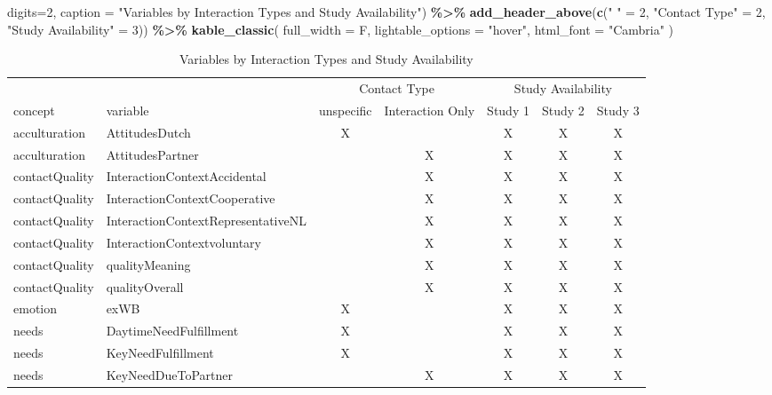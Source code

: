 \documentclass[
]{article}
\newenvironment{Shaded}{\begin{snugshade}}{\end{snugshade}}
\newcommand{\AttributeTok}[1]{\textcolor[rgb]{0.13,0.29,0.53}{#1}}
\newcommand{\DecValTok}[1]{\textcolor[rgb]{0.00,0.00,0.81}{#1}}
\newcommand{\FunctionTok}[1]{\textcolor[rgb]{0.13,0.29,0.53}{\textbf{#1}}}
\newcommand{\NormalTok}[1]{#1}
\newcommand{\OtherTok}[1]{\textcolor[rgb]{0.56,0.35,0.01}{#1}}
\newcommand{\SpecialCharTok}[1]{\textcolor[rgb]{0.81,0.36,0.00}{\textbf{#1}}}
\newcommand{\StringTok}[1]{\textcolor[rgb]{0.31,0.60,0.02}{#1}}
\begin{document}
\begin{Shaded}
\begin{Highlighting}[]
      \AttributeTok{digits=}\DecValTok{2}\NormalTok{,}
      \AttributeTok{caption =} \StringTok{"Variables by Interaction Types and Study Availability"}\NormalTok{) }\SpecialCharTok{\%\textgreater{}\%}
  \FunctionTok{add\_header\_above}\NormalTok{(}\FunctionTok{c}\NormalTok{(}\StringTok{" "} \OtherTok{=} \DecValTok{2}\NormalTok{, }\StringTok{"Contact Type"} \OtherTok{=} \DecValTok{2}\NormalTok{, }\StringTok{"Study Availability"} \OtherTok{=} \DecValTok{3}\NormalTok{)) }\SpecialCharTok{\%\textgreater{}\%}
  \FunctionTok{kable\_classic}\NormalTok{(}
    \AttributeTok{full\_width =}\NormalTok{ F,}
    \AttributeTok{lightable\_options =} \StringTok{"hover"}\NormalTok{,}
    \AttributeTok{html\_font =} \StringTok{"Cambria"}
\NormalTok{  )}
\end{Highlighting}
\end{Shaded}

\begin{table}

\caption{\label{tab:variables included in main analysis by response type}Variables by Interaction Types and Study Availability}
\centering
\begin{tabular}[t]{llccccc}
\toprule
\multicolumn{2}{c}{ } & \multicolumn{2}{c}{Contact Type} & \multicolumn{3}{c}{Study Availability} \\
\cmidrule(l{3pt}r{3pt}){3-4} \cmidrule(l{3pt}r{3pt}){5-7}
concept & variable & unspecific & Interaction Only & Study 1 & Study 2 & Study 3\\
\midrule
acculturation & AttitudesDutch & X &  & X & X & X\\
acculturation & AttitudesPartner &  & X & X & X & X\\
contactQuality & InteractionContextAccidental &  & X & X & X & X\\
contactQuality & InteractionContextCooperative &  & X & X & X & X\\
contactQuality & InteractionContextRepresentativeNL &  & X & X & X & X\\
\addlinespace
contactQuality & InteractionContextvoluntary &  & X & X & X & X\\
contactQuality & qualityMeaning &  & X & X & X & X\\
contactQuality & qualityOverall &  & X & X & X & X\\
emotion & exWB & X &  & X & X & X\\
needs & DaytimeNeedFulfillment & X &  & X & X & X\\
\addlinespace
needs & KeyNeedFulfillment & X &  & X & X & X\\
needs & KeyNeedDueToPartner &  & X & X & X & X\\
\bottomrule
\end{tabular}
\end{table}
\end{document}
